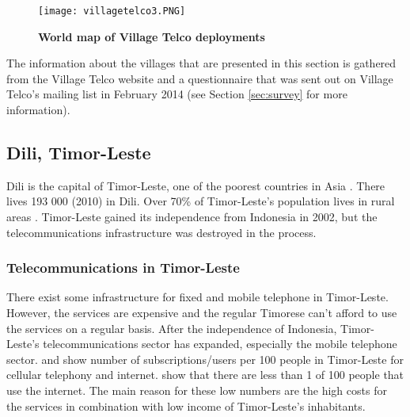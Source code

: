 \begin{figure}[H]
\centering
\texttt{[image: villagetelco3.PNG]}
\caption [World map of Village Telco deployments]{\textbf{World map of Village Telco deployments}}
\label{fig:map_deployments}
\end{figure}

The information about the villages that are presented in this section is gathered from the Village Telco website\cite{village_telco_deployments} and a questionnaire that was sent out on Village Telco's mailing list in February 2014 (see Section \ref{sec:survey} for more information).

\subsection{Dili, Timor-Leste}\label{sec:timor}
Dili is the capital of Timor-Leste, one of the poorest countries in Asia \cite{vt_dili}. There lives 193 000 (2010) in Dili. Over 70\% of Timor-Leste's population lives in rural areas \cite{quandl_timor}.  Timor-Leste gained its independence from Indonesia in 2002, but the telecommunications infrastructure was destroyed in the process. 


\subsubsection{Telecommunications in Timor-Leste}
There exist some infrastructure for fixed and mobile telephone in Timor-Leste. However, the services are expensive and the regular Timorese can't afford to use the services on a regular basis. After the independence of Indonesia, Timor-Leste's telecommunications sector has expanded, especially the mobile telephone sector.  and  show number of subscriptions/users per 100 people in Timor-Leste for cellular telephony and internet.  show that there are less than 1 of 100 people that use the internet. The main reason for these low numbers are the high costs for the services in combination with low income of Timor-Leste's inhabitants. 



